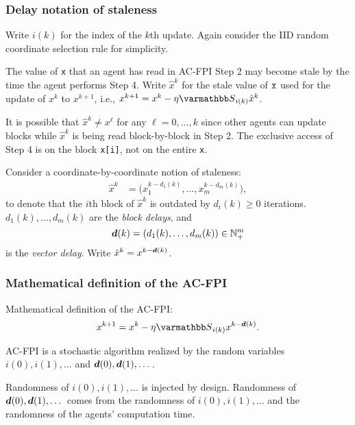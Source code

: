 \documentclass[10pt,mathserif]{beamer}
\begin{document}
\begin{frame}[fragile]
\frametitle{Delay notation of staleness}

Write $i(k)$ for the index of the $k$th update.
Again consider the IID random coordinate selection rule for simplicity.

\vspace{0.1in}

The value of \verb|x| that an agent has read in AC-FPI Step 2 may become stale by the time the agent performs Step 4.
Write $\hat{x}^k$ for the stale value of $\verb|x|$ used for the update of $x^k$ to $x^{k+1}$, i.e., $x^{k+1}=x^k-\eta \opS_{i(k)}\hat{x}^k$.
\vspace{0.1in}

It is possible that $\hat{x}^k\ne x^\ell$ for any $\ell=0,\dots,k$ since other agents can update blocks while $\hat{x}^k$ is being read block-by-block in Step 2.
The exclusive access of Step 4 is on the block \verb|x[i]|, not on the entire \verb|x|.

\vspace{0.1in}

Consider a coordinate-by-coordinate notion of staleness:
\begin{align*}
  \hat{x}^k & =\big( x_1^{k-d_1(k)},\dots,x_m^{k-d_m(k)}\big),
\end{align*}
to denote that the $i$th block of $\hat{x}^k$ is outdated by $d_i(k)\ge 0$ iterations.
$d_1(k),\dots,d_m(k)$ are the \emph{block delays}, and
\[
\boldsymbol{d}(k)=(d_1(k),\dots,d_m(k)) \in\mathbb{N}^m_+
\]
is the \emph{vector delay}. Write $\hat{x}^k=x^{k-\boldsymbol{d}(k)}$.
\end{frame}


\begin{frame}
\frametitle{Mathematical definition of the AC-FPI}
Mathematical definition of the AC-FPI:
\begin{equation}\label{eq:ac_fpi}
x^{k+1}=x^k-\eta \opS_{i(k)}x^{k-\vecdelay(k)}.
\end{equation}
\vspace{0.1in}

AC-FPI is a stochastic algorithm realized by the random variables $i(0),i(1),\dots$ and $\boldsymbol{d}(0),\boldsymbol{d}(1),\dots$.
\vspace{0.1in}

Randomness of $i(0),i(1),\dots$ is injected by design.
Randomness of $\boldsymbol{d}(0),\boldsymbol{d}(1),\dots$ comes from the randomness of $i(0),i(1),\dots$ and the randomness of the agents' computation time.
\end{frame}
\end{document}
